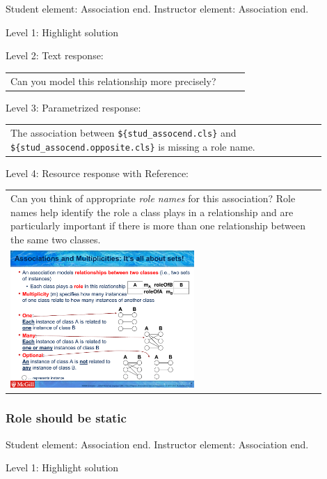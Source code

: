 Student element: Association end. Instructor element: Association end. \medskip

\noindent Level 1: Highlight solution  \medskip

\noindent Level 2: Text response: \medskip

\begin{tabular}{|p{0.9\linewidth}}
Can you model this relationship more precisely?
\end{tabular} \medskip

\noindent Level 3: Parametrized response: \medskip

\begin{tabular}{|p{0.9\linewidth}}
The association between \verb|${stud_assocend.cls}| and \verb|${stud_assocend.opposite.cls}| is missing a role name.
\end{tabular} \medskip

\noindent Level 4: Resource response with Reference: \medskip

\begin{tabular}{|p{0.9\linewidth}}
Can you think of appropriate \textit{role names}
for this association? Role names help identify the role a class plays in a
relationship and are particularly important if there is more than one relationship
between the same two classes.

\\
\includegraphics[width=0.6\textwidth]{images/role_name.png}

\end{tabular} \medskip


\subsubsection{Role should be static}

Student element: Association end. Instructor element: Association end. \medskip

\noindent Level 1: Highlight solution  \medskip

